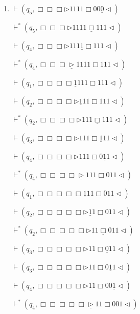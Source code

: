 \documentclass[12pt,a4paper]{article}
\makeatletter
\newtheorem*{solution}{Solution}
\theoremstyle{definition}
\renewenvironment{solution}[1][Solution] {\par\pushQED{\qed}\normalfont\topsep6\p@\@plus6\p@\relax\trivlist\item[\hskip\labelsep\bfseries#1\@addpunct{.}]\ignorespaces}{\popQED\endtrivlist\@endpefalse} \makeatother
\makeatother
\begin{document}
\begin{enumerate}
\begin{solution}
\begin{enumerate}
\begin{minipage}{0.27\textwidth}
\begin{center}
				$\vdash (q_5,\Box \Box \Box\triangleright  1  1  1  1 \Box 0 0 \underline{0}\triangleleft)$
				
				$\vdash^* (q_5,\Box \Box \Box\triangleright  1  1  1  1 \underline{\Box} 1 1 1\triangleleft)$
				
				$\vdash (q_4,\Box \Box \Box\triangleright  1  1  1  \underline{1} \Box 1 1 1\triangleleft)$
				
				$\vdash^* (q_4,\Box \Box \Box\underline{\triangleright}  1  1  1  1 \Box 1 1 1\triangleleft)$
				
				
				$\vdash (q_1,\Box \Box \Box\Box\underline{1} 1  1  1 \Box 1 1 1\triangleleft)$
				
				$\vdash (q_2,\Box \Box \Box\Box\triangleright\underline{1} 1  1 \Box 1 1 1\triangleleft)$
				
				$\vdash^* (q_2,\Box \Box \Box\Box\triangleright1 1  1 \underline{\Box} 1 1 1\triangleleft)$
				
				$\vdash (q_3,\Box \Box \Box\Box\triangleright1 1  1 \Box \underline{1} 1 1\triangleleft)$
				
				$\vdash (q_4,\Box \Box \Box\Box\triangleright1 1  1 \Box0 \underline{1} 1\triangleleft)$
				
				$\vdash^* (q_4,\Box \Box \Box\Box\underline{\triangleright}1 1  1 \Box0 1 1\triangleleft)$
				
				
				$\vdash (q_1,\Box \Box \Box\Box\Box\underline{1}  1  1 \Box 0 1 1\triangleleft)$
				
				$\vdash (q_2,\Box \Box \Box\Box\Box\triangleright\underline{1} 1 \Box0 1 1\triangleleft)$
				
				$\vdash^* (q_2,\Box \Box \Box\Box\Box\triangleright1  1 \underline{\Box} 0 1 1\triangleleft)$
				
				$\vdash (q_3,\Box \Box \Box\Box\Box\triangleright1  1 \Box \underline{0} 1 1\triangleleft)$
				
				$\vdash (q_3,\Box \Box \Box\Box\Box\triangleright1  1 \Box0 \underline1 1\triangleleft)$
				
				$\vdash (q_4,\Box \Box \Box\Box\Box\triangleright1  1 \Box0 0\underline1\triangleleft)$
				
				$\vdash^* (q_4,\Box \Box \Box\Box\Box\underline{\triangleright}1  1 \Box00 1\triangleleft)$
				
				

\end{center}
\end{minipage}
\end{enumerate}
\end{solution}
\end{enumerate}
\end{document}
